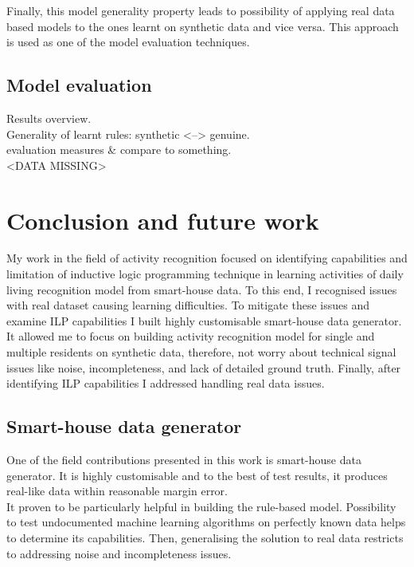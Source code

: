\documentclass[10pt, a4paper, pdflatex, leqno, twoside, openright]{report}
\begin{document}
Finally, this model generality property leads to possibility of applying real data based models to the ones learnt on synthetic data and vice versa. This approach is used as one of the model evaluation techniques.

  \section{Model evaluation}
Results overview.\\
Generality of learnt rules: synthetic <--> genuine.\\
evaluation measures \& compare to something.\\

<DATA MISSING>

\chapter{Conclusion and future work\label{ch:summary}}
My work in the field of activity recognition focused on identifying capabilities and limitation of inductive logic programming technique in learning activities of daily living recognition model from smart-house data. To this end, I recognised issues with real dataset causing learning difficulties. To mitigate these issues and examine ILP capabilities I built highly customisable smart-house data generator. It allowed me to focus on building activity recognition model for single and multiple residents on synthetic data, therefore, not worry about technical signal issues like noise, incompleteness, and lack of detailed ground truth. Finally, after identifying ILP capabilities I addressed handling real data issues.

  \section{Smart-house data generator} %
One of the field contributions presented in this work is smart-house data generator. It is highly customisable and to the best of test results, it produces real-like data within reasonable margin error.\\
It proven to be particularly helpful in building the rule-based model. Possibility to test undocumented machine learning algorithms on perfectly known data helps to determine its capabilities. Then, generalising the solution to real data restricts to addressing noise and incompleteness issues.\\
\end{document}
